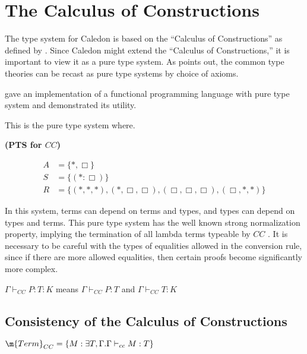 \section{The Calculus of Constructions}

The type system for Caledon is based on the ``Calculus of Constructions'' as defined by \citet{coquand1986calculus}.
Since Caledon might extend the ``Calculus of Constructions,'' it is important to view it as a pure type system. 
As \citet{barendregt1991introduction} points out, the common type theories can be recast as pure type systems
by choice of axioms. 

\citet{roorda2001pure} gave an implementation of a functional programming language with 
pure type system and demonstrated its utility.

This is the pure type system where.

\begin{definition}
\textbf{(PTS for $CC$)}

\begin{align}
A &= \{ *, \Box \}
\\
S &= \{ (* : \Box) \}
\\
R &= \{ (*,*,*),(*,\Box,\Box),(\Box,\Box,\Box),(\Box,*,*)\}
\end{align}  

\label{coc:types}
\end{definition}

In this system, terms can depend on terms and types, 
and types can depend on types and terms.  
This pure type system has the well known strong normalization property, implying the termination of 
all lambda terms typeable by $CC$ \citep{Geuvers94ashort} \citep{geuvers1991modular}.
It is necessary to be careful with the types of equalities allowed in the conversion rule, 
since if there are more allowed equalities, then certain proofs
become significantly more complex.

\begin{definition}
$\Gamma \vdash_{CC} P : T : K$ means $\Gamma \vdash_{CC} P : T$ and $\Gamma \vdash_{CC} T : K$
\end{definition}


\subsection{Consistency of the Calculus of Constructions}

\begin{definition}
$ \m{Term}_{CC}  = \{ M : \exists T,\Gamma . \Gamma \vdash_{cc} M : T \}$
\end{definition}


